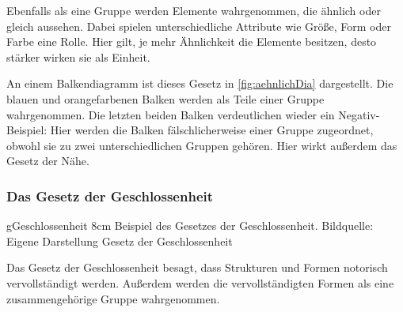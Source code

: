 Ebenfalls als eine Gruppe werden Elemente wahrgenommen, die ähnlich oder gleich aussehen.
Dabei spielen unterschiedliche Attribute wie Größe, Form oder Farbe eine Rolle.
Hier gilt, je mehr Ähnlichkeit die Elemente besitzen, desto stärker wirken sie als Einheit.

An einem Balkendiagramm ist dieses Gesetz in \ref{fig:aehnlichDia} dargestellt.
Die blauen und orangefarbenen Balken werden als Teile einer Gruppe wahrgenommen.
Die letzten beiden Balken verdeutlichen wieder ein Negativ-Beispiel: Hier werden die Balken fälschlicherweise einer Gruppe zugeordnet, obwohl sie zu zwei unterschiedlichen Gruppen gehören.
Hier wirkt außerdem das Gesetz der Nähe.


\subsubsection{Das Gesetz der Geschlossenheit}
\bild
{gGeschlossenheit}
{8cm}
{Beispiel des Gesetzes der Geschlossenheit. Bildquelle: Eigene Darstellung}
{Gesetz der Geschlossenheit}

Das Gesetz der Geschlossenheit besagt, dass Strukturen und Formen notorisch vervollständigt werden.
Außerdem werden die vervollständigten Formen als eine zusammengehörige Gruppe wahrgenommen.

